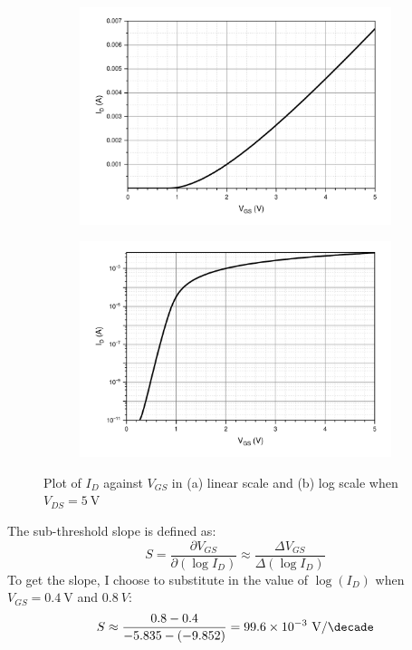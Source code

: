 \documentclass[12pt]{article}   %
\begin{document}
	\begin{figure}[htbp]
		\centering
		\begin{subfigure}{0.48\linewidth}
			\includegraphics[width=\linewidth]{Figures/E1_NMOS_Characteristic/Id_vgs_linear}
			\caption{}
			\label{fig:idVgsLinear}
		\end{subfigure}
		\begin{subfigure}{0.48\linewidth}
			\includegraphics[width=\linewidth]{Figures/E1_NMOS_Characteristic/Id_vgs_log}
			\caption{}
			\label{fig:idVgsLog}
		\end{subfigure}
		\caption{Plot of $I_{D}$ against $V_{GS}$ in (a) linear scale and (b) log scale when $V_{DS} = \SI{5}{\volt}$}
	\end{figure}
	
	The sub-threshold slope is defined as\cite{razaviDesignAnalogCMOS2017}:
	\begin{equation}
		S = \frac{\partial V_{GS}}{\partial \left(\log I_D\right)} \approx \frac{\Delta V_{GS}}{\Delta \left(\log I_D\right)}
	\end{equation}
	To get the slope, I choose to substitute in the value of $\log(I_D)$ when $V_{GS} = \SI{0.4}{\volt}$ and $\SI{0.8}{V}$:
	\begin{equation}
		S \approx \frac{0.8 - 0.4}{-5.835 - \left(-9.852\right)} = 99.6 \times 10^{-3}\ \si{\volt\per\decade}
	\end{equation}
	
\end{document}

